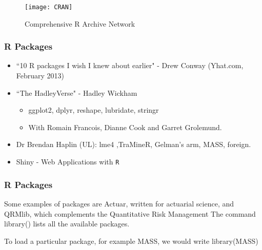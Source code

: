  
 
 \begin{figure}
 \centering
 \texttt{[image: CRAN]}
 \caption{Comprehensive R Archive Network}
 
 \end{figure}
 
 
 
 
 
 
 \frametitle{R Packages}
 
 \begin{itemize}
 \item ``10 R packages I wish I knew about earlier" - Drew Conway (Yhat.com, February 2013)
 \bigskip \item ``The HadleyVerse" - Hadley Wickham
 \begin{itemize}
 
 \item  ggplot2, dplyr, reshape, lubridate, stringr
 
 \item  With Romain Francois, Dianne Cook and Garret Grolemund.
 \end{itemize}
 \bigskip
 \item Dr Brendan Haplin (UL): lme4 ,TraMineR, Gelman's arm, MASS, foreign. 
 \bigskip
 \item Shiny - Web Applications with \texttt{R}
 \end{itemize}
 
 
 \frametitle{R Packages}
 
 
 
 
 Some examples of packages are Actuar, written for actuarial science, and
 QRMlib, which complements the Quantitative Risk Management The command library()
 lists all the available packages. 
 
 To load a particular package, for example MASS, we would
 write
 library(MASS)
 
 
 
